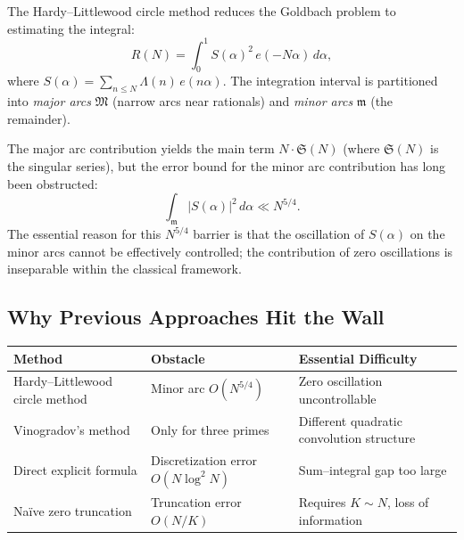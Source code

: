 \documentclass[11pt,a4paper]{article}
\theoremstyle{remark}
\newcommand{\frakM}{\mathfrak{M}}
\newcommand{\frakm}{\mathfrak{m}}
\begin{document}
The Hardy--Littlewood circle method reduces the Goldbach problem to estimating the integral:
\begin{equation}
R(N) = \int_0^1 S(\alpha)^2\, e(-N\alpha)\, d\alpha,
\end{equation}
where $S(\alpha) = \sum_{n \leq N} \Lambda(n)\, e(n\alpha)$. The integration interval is partitioned into \emph{major arcs} $\frakM$ (narrow arcs near rationals) and \emph{minor arcs} $\frakm$ (the remainder).

The major arc contribution yields the main term $N \cdot \mathfrak{S}(N)$ (where $\mathfrak{S}(N)$ is the singular series), but the error bound for the minor arc contribution has long been obstructed:
\begin{equation}
\int_{\frakm} |S(\alpha)|^2\, d\alpha \ll N^{5/4}.
\end{equation}
The essential reason for this $N^{5/4}$ barrier is that the oscillation of $S(\alpha)$ on the minor arcs cannot be effectively controlled; the contribution of zero oscillations is inseparable within the classical framework.

\subsection{Why Previous Approaches Hit the Wall}

\begin{center}
\begin{tabularx}{\linewidth}{@{}>{\raggedright\arraybackslash}X>{\raggedright\arraybackslash}X>{\raggedright\arraybackslash}X@{}}
\toprule
\textbf{Method} & \textbf{Obstacle} & \textbf{Essential Difficulty} \\
\midrule
Hardy--Littlewood circle method & Minor arc $O(N^{5/4})$ & Zero oscillation uncontrollable \\
Vinogradov's method & Only for three primes & Different quadratic convolution structure \\
Direct explicit formula & Discretization error $O(N\log^2 N)$ & Sum--integral gap too large \\
Na\"ive zero truncation & Truncation error $O(N/K)$ & Requires $K \sim N$, loss of information \\
\bottomrule
\end{tabularx}
\end{center}
\end{document}
